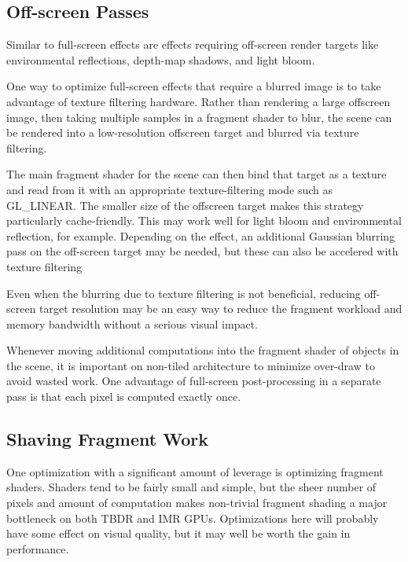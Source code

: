 \subsection{Off-screen Passes}\label{Jon-McCaffrey-Off-Screen-Pass}


Similar to full-screen effects are effects requiring off-screen render targets like environmental reflections, depth-map shadows, and light bloom.

One way to optimize full-screen effects that require a blurred image is to take
advantage of texture filtering hardware.  Rather than rendering a large
offscreen image, then taking multiple samples in a fragment shader to blur, the
scene can be rendered into a low-resolution offscreen target and blurred via texture filtering.

The main fragment shader for the scene can then bind that target as a texture
and read from it with an appropriate texture-filtering mode such as GL\_LINEAR.
The smaller size of the offscreen target makes this strategy particularly
cache-friendly.  This may work well for light bloom and environmental
reflection, for example.  Depending on the effect, an additional Gaussian
blurring pass on the off-screen target may be needed, but these can also be
accelered with texture filtering \cite{bloom}

Even when the blurring due to texture filtering is not beneficial, reducing
off-screen target resolution may be an easy way to reduce the fragment workload
and memory bandwidth without a serious visual impact.

Whenever moving additional computations into the fragment shader of objects in
the scene, it is important on non-tiled architecture to minimize over-draw to
avoid wasted work.  One advantage of full-screen post-processing in a separate
pass is that each pixel is computed exactly once.

\subsection{Shaving Fragment Work}\label{Jon-McCaffrey-Shaving-Fragment-Work}

One optimization with a significant amount of leverage is optimizing fragment shaders.  Shaders tend to be fairly small and simple, but the sheer number of pixels and amount of computation makes non-trivial fragment shading a major bottleneck on both TBDR and IMR GPUs.  Optimizations here will probably have some effect on visual quality, but it may well be worth the gain in performance.

